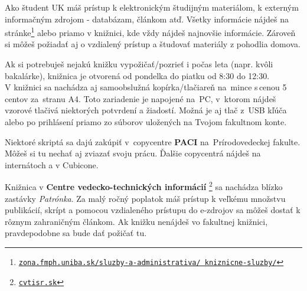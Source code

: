 Ako študent UK máš prístup k elektronickým študijným materiálom, k externým informačným zdrojom - databázam, článkom atď. Všetky informácie nájdeš na stránke\footnote{\href{https://zona.fmph.uniba.sk/sluzby-a-administrativa/kniznicne-sluzby/}{\texttt{zona.fmph.uniba.sk/sluzby-a-administrativa/ kniznicne-sluzby/}}} alebo priamo v knižnici, kde vždy nájdeš najnovšie informácie. Zároveň si môžeš požiadať aj o vzdialený prístup a študovať materiály z pohodlia domova. \Smiley

\begin{table}[h!]
\begin{centering}

\par\end{centering}
\protect\caption{Otváracie hodiny knižnice počas akademického roka (od 1.9 - 30.6). Každý posledný piatok v mesiaci je knižnica zatvorená z~dôvodu sanitárneho dňa.}
\label{tab:uradne_hodiny}
\end{table}

Ak si potrebuješ nejakú knižku vypožičať/pozrieť i počas leta (napr. kvôli bakalárke), knižnica je otvorená od pondelka do piatku od 8:30 do 12:30.\\

\noindent
V knižnici sa nachádza aj samoobslužná kopírka/tlačiareň na~mince s\,cenou 5 centov za~stranu A4. Toto zariadenie je napojené na~PC, v~ktorom nájdeš vzorové tlačivá niektorých potvrdení a žiadostí. Možná je aj tlač z~USB kľúča alebo po prihlásení priamo zo súborov uložených na Tvojom fakultnom konte.

Niektoré skriptá sa dajú zakúpiť v~copycentre \textbf{PACI} na~Prírodovedeckej
fakulte. Môžeš si tu nechať aj zviazať svoju prácu. Ďalšie copycentrá
nájdeš na internátoch a v Cubicone.

\begin{comment}
Rôzne skriptá môžeš nájsť a následne si aj vziať v \textbf{skriptárni}, t.j. na označenej poličke pred knižnicou, kde môže ktokoľvek pre druhého študenta zanechať svoje už nepotrebné skriptá.
\end{comment}

Knižnica v \textbf{Centre vedecko-technických informácií}%
\footnote{\href{http://www.cvtisr.sk/}{\texttt{cvtisr.sk}}%
} sa nachádza blízko zastávky \emph{Patrónka}. Za malý ročný poplatok máš prístup k veľkému množstvu publikácií, skrípt a pomocou vzdialeného prístupu do e-zdrojov sa môžeš dostať k rôznym zahraničným článkom. Ak knižku nenájdeš vo fakultnej knižnici, pravdepodobne sa bude dať požičať tu.

